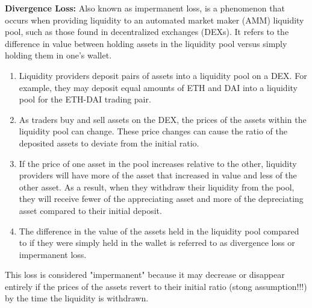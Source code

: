 \textbf{Divergence Loss:} Also known as impermanent loss, is a phenomenon that occurs when providing liquidity to an automated market maker (AMM) liquidity pool, such as those found in decentralized exchanges (DEXs). It refers to the difference in value between holding assets in the liquidity pool versus simply holding them in one's wallet.
\begin{enumerate}
\item Liquidity providers deposit pairs of assets into a liquidity pool on a DEX. For example, they may deposit equal amounts of ETH and DAI into a liquidity pool for the ETH-DAI trading pair.
\item As traders buy and sell assets on the DEX, the prices of the assets within the liquidity pool can change. These price changes can cause the ratio of the deposited assets to deviate from the initial ratio.
\item  If the price of one asset in the pool increases relative to the other, liquidity providers will have more of the asset that increased in value and less of the other asset. As a result, when they withdraw their liquidity from the pool, they will receive fewer of the appreciating asset and more of the depreciating asset compared to their initial deposit.
\item The difference in the value of the assets held in the liquidity pool compared to if they were simply held in the wallet is referred to as divergence loss or impermanent loss. 
\end{enumerate}
This loss is considered "impermanent" because it may decrease or disappear entirely if the prices of the assets revert to their initial ratio (stong assumption!!!) by the time the liquidity is withdrawn.\\

